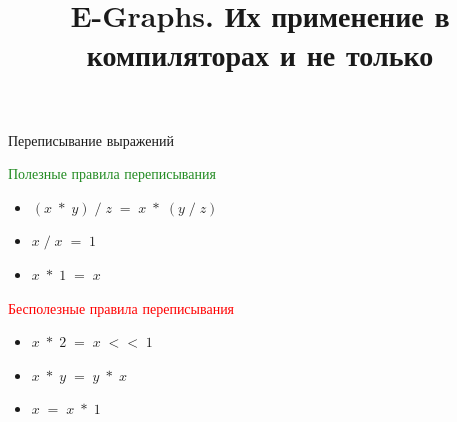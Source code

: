 \documentclass[aspectratio=169
  , xcolor={svgnames}
  , russian  %
  ]{beamer}
\title[E-Graphs]{E-Graphs. Их применение в компиляторах и не только}
\date{\DTMDate{2024-09-28}}
\begin{document}
\maketitle


\begin{frame}{Переписывание выражений}

{
\centering

\Huge
{}

\vspace{1cm}


}

{
\centering

\Huge
{}

\vspace{1cm}

\Large
{}

\vfill

}

{
\centering

\Huge
{}

\vspace{1cm}

\Large
{}

\vfill

\begin{multicols}{2}
    \textcolor{ForestGreen}{Полезные правила переписывания}
    \begin{itemize}
        \item $(x\; * \;y) \;/ \;z \;= \;x\; * \;(y \;/ \;z)$
        \item $x \; / \; x \; = \; 1$
        \item $x \; * \; 1 \; = \; x$
    \end{itemize}

    \columnbreak

    {\fontsize{13.1}{12}\selectfont \textcolor{red}{Бесполезные правила переписывания}}
    \begin{itemize}
        \item $x\; * \;2 \; = \;  x \; << \; 1$
        \item $x \;*\; y \;= \;y \;* \;x$
        \item $x \;= \;x \;* \;1$
    \end{itemize}
\end{multicols}
}
\end{frame}
\end{document}

